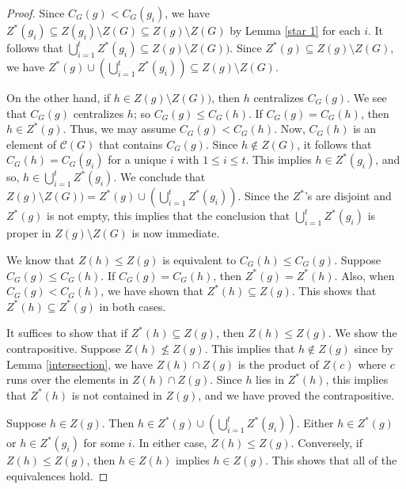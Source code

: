 \documentclass[10pt,a4paper]{amsart}
\begin{document}
\begin{proof}
Since $C_G (g) < C_G (g_i)$, we have $Z^* (g_i) \subseteq Z(g_i) \setminus Z(G) \subseteq Z(g) \setminus Z(G)$ by Lemma \ref{star 1} for each $i$.  It follows that $\displaystyle \bigcup_{i=1}^t Z^* (g_i) \subseteq Z(g) \setminus Z(G))$.  Since $Z^* (g) \subseteq Z(g) \setminus Z (G)$, we have $\displaystyle Z^* (g) \cup (\bigcup_{i=1}^t Z^* (g_i)) \subseteq Z(g) \setminus Z(G)$.
	
On the other hand, if $h \in Z(g) \setminus Z(G))$, then $h$ centralizes $C_G (g)$.  We see that $C_G (g)$ centralizes $h$; so $C_G (g) \le C_G (h)$.  If $C_G (g) = C_G (h)$, then $h \in Z^* (g)$.  Thus, we may assume $C_G (g) < C_G (h)$.  Now, $C_G (h)$ is an element of ${\mathcal C} (G)$ that contains $C_G (g)$.   Since $h \not\in Z(G)$, it follows that $C_G (h) = C_G (g_i)$ for a unique $i$ with $1 \le i \le t$.  This implies $h \in Z^* (g_i)$, and so, $\displaystyle h \in \bigcup_{i=1}^t Z^* (g_i)$.  We conclude that $\displaystyle Z(g) \setminus Z(G)) = Z^* (g) \cup (\bigcup_{i=1}^t Z^* (g_i))$.   Since the $Z^*$'s are disjoint and $Z^* (g)$ is not empty, this implies that  the conclusion that $\displaystyle \bigcup_{i=1}^t Z^* (g_i)$ is proper in $Z(g) \setminus Z(G)$ is now immediate. 
	
We know that $Z(h) \le Z(g)$ is equivalent to $C_G (h) \le C_G (g)$.  Suppose $C_G (g) \le C_G (h)$.  If $C_G (g) = C_G (h)$, then $Z^* (g) = Z^* (h)$.  Also, when $C_G (g) < C_G (h)$, we have shown that $Z^* (h) \subseteq Z (g)$.  This shows that $Z^* (h) \subseteq Z^* (g)$ in both cases.
	
It suffices to show that if $Z^* (h) \subseteq Z (g)$, then $Z(h) \le Z(g)$.  We show the contrapositive.  Suppose $Z (h) \not\le Z (g)$.  This implies that $h \not\in Z(g)$ since by Lemma \ref{intersection}, we have $Z(h) \cap Z(g)$ is the product of $Z (c)$ where $c$ runs over the elements in $Z(h) \cap Z(g)$.  Since $h$ lies in $Z^* (h)$, this implies that $Z^* (h)$ is not contained in $Z(g)$, and we have proved the contrapositive.
	
Suppose $h \in Z(g)$.  Then $\displaystyle h \in Z^* (g) \cup (\bigcup_{i=1}^t Z^* (g_i))$.  Either $h \in Z^* (g)$ or $h \in Z^* (g_i)$ for some $i$.  In either case, $Z (h) \le Z(g)$.  Conversely, if $Z(h) \le Z(g)$, then $h \in Z(h)$ implies $h \in Z(g)$.  This shows that all of the equivalences hold.
\end{proof}
\end{document}
